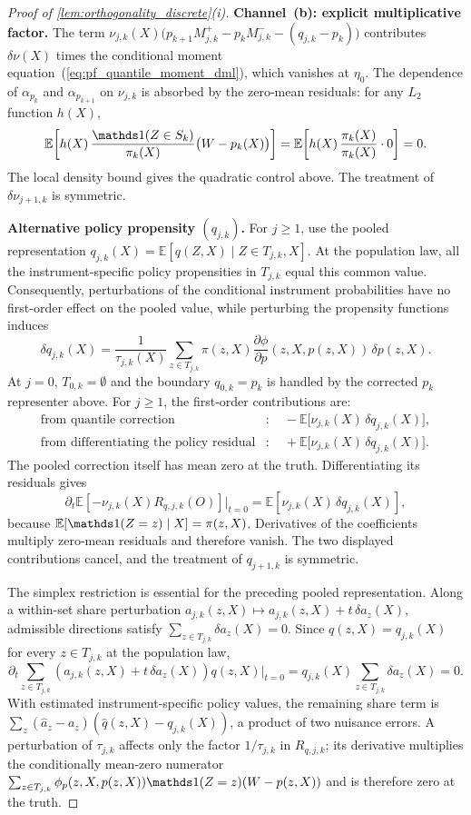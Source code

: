 \begin{proof}[Proof of \cref{lem:orthogonality_discrete}\textup{(i)}]
\textbf{Channel~(b): explicit multiplicative factor.} The term $\nu_{j,k}(X)\bigl(p_{k+1} M_{j,k}^+ - p_k M_{j,k}^- - (q_{j,k} - p_k)\bigr)$ contributes $\delta\nu(X)$ times the conditional moment equation~(\ref{eq:pf_quantile_moment_dml}), which vanishes at $\eta_0$. The dependence of $\alpha_{p_k}$ and $\alpha_{p_{k+1}}$ on $\nu_{j,k}$ is absorbed by the zero-mean residuals: for any $L_2$ function $h(X)$,
\[
    \mathbb{E}\!\left[h(X)\,\frac{\indicator(Z \in S_k)}{\pi_k(X)}\bigl(W - p_k(X)\bigr)\right] = \mathbb{E}\!\left[h(X)\,\frac{\pi_k(X)}{\pi_k(X)}\cdot 0\right] = 0.
\]
The local density bound gives the quadratic control above. The treatment of $\delta\nu_{j+1,k}$ is symmetric.

\textbf{Alternative policy propensity $(q_{j,k})$.}
For $j\geqslant1$, use the pooled representation $q_{j,k}(X)=\mathbb E[q(Z,X)\mid Z\in T_{j,k},X]$. At the population law, all the instrument-specific policy propensities in $T_{j,k}$ equal this common value. Consequently, perturbations of the conditional instrument probabilities have no first-order effect on the pooled value, while perturbing the propensity functions induces
\[
    \delta q_{j,k}(X)
    =\frac{1}{\tau_{j,k}(X)}
      \sum_{z\in T_{j,k}}\pi(z,X)
      \frac{\partial\phi}{\partial p}(z,X,p(z,X))\,\delta p(z,X).
\]
At $j=0$, $T_{0,k}=\emptyset$ and the boundary $q_{0,k}=p_k$ is handled by the corrected $p_k$ representer above. For $j\geqslant1$, the first-order contributions are:
\begin{align*}
    \text{from quantile correction}&: \quad -\mathbb{E}\bigl[\nu_{j,k}(X)\,\delta q_{j,k}(X)\bigr], \\
    \text{from differentiating the policy residual}&: \quad +\mathbb{E}\bigl[\nu_{j,k}(X)\,\delta q_{j,k}(X)\bigr].
\end{align*}
The pooled correction itself has mean zero at the truth. Differentiating its residuals gives
\[
    \partial_t\mathbb E[-\nu_{j,k}(X)R_{q,j,k}(O)]\big|_{t=0}
    =\mathbb E[\nu_{j,k}(X)\,\delta q_{j,k}(X)],
\]
because $\mathbb E[\indicator(Z=z)\mid X]=\pi(z,X)$. Derivatives of the coefficients multiply zero-mean residuals and therefore vanish. The two displayed contributions cancel, and the treatment of $q_{j+1,k}$ is symmetric.

The simplex restriction is essential for the preceding pooled representation. Along a within-set share perturbation $a_{j,k}(z,X)\mapsto a_{j,k}(z,X)+t\,\delta a_z(X)$, admissible directions satisfy $\sum_{z\in T_{j,k}}\delta a_z(X)=0$. Since $q(z,X)=q_{j,k}(X)$ for every $z\in T_{j,k}$ at the population law,
\[
    \partial_t\sum_{z\in T_{j,k}}(a_{j,k}(z,X)+t\,\delta a_z(X))q(z,X)\Big|_{t=0}
    =q_{j,k}(X)\sum_{z\in T_{j,k}}\delta a_z(X)=0.
\]
With estimated instrument-specific policy values, the remaining share term is $\sum_z(\hat a_z-a_z)(\hat q(z,X)-q_{j,k}(X))$, a product of two nuisance errors. A perturbation of $\tau_{j,k}$ affects only the factor $1/\tau_{j,k}$ in $R_{q,j,k}$; its derivative multiplies the conditionally mean-zero numerator $\sum_{z\in T_{j,k}}\phi_p(z,X,p(z,X))\indicator(Z=z)(W-p(z,X))$ and is therefore zero at the truth.


\end{proof}

